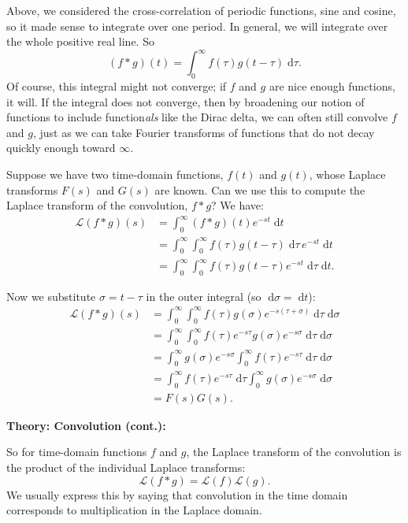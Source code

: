 \documentclass{article}
\newcommand{\diff}{\;\mathrm{d}}
\begin{document}
Above, we considered the cross-correlation of periodic functions, sine and cosine, so it made sense to integrate over one period. In general, we will integrate over the whole positive real line. So
\[(f\ast g)(t)=\int_{0}^\infty f(\tau)g(t-\tau)\diff \tau.\]
Of course, this integral might not converge; if $f$ and $g$ are nice enough functions, it will. If the integral does not converge, then by broadening our notion of functions to include function\textit{als} like the Dirac delta, we can often still convolve $f$ and $g$, just as we can take Fourier transforms of functions that do not decay quickly enough toward $\infty$.\bigskip



Suppose we have two time-domain functions, $f(t)$ and $g(t)$, whose Laplace transforms $F(s)$ and $G(s)$ are known. Can we use this to compute the Laplace transform of the convolution, $f\ast g$? We have:
\begin{align*}
	\mathcal{L}\left({f\ast g}\right)(s) &=\int_{0}^\infty (f\ast g)(t)e^{-st}\diff t\\
	&=\int_{0}^\infty\int_{0}^\infty f(\tau)g(t-\tau)\diff \tau\,e^{-s t}\diff t\\
	&=\int_0^\infty\int_0^\infty f(\tau)g(t-\tau)e^{-s t}\diff \tau\diff t.
\end{align*}

Now we substitute $\sigma=t-\tau$ in the outer integral (so $\diff \sigma =\diff t$):
\begin{align*}
	\mathcal{L}\left({f\ast g}\right)(s)&= \int_0^\infty\int_0^\infty f(\tau)g(\sigma)e^{-s (\tau+\sigma)}\diff \tau\diff\sigma\\
	&=\int_0^\infty \int_0^\infty f(\tau)e^{-s \tau}g(\sigma)e^{-s \sigma}\diff \tau\diff \sigma\\
	&=\int_0^\infty g(\sigma) e^{-s \sigma}\int_{0}^\infty f(\tau)e^{-s \tau}\diff \tau \diff\sigma\\
	&=\int_{0}^\infty f(\tau)e^{-s \tau}\diff \tau \int_{0}^\infty g(\sigma)e^{-s \sigma}\diff\sigma\\
	&=F(s)G(s).
\end{align*}


\clearpage


\textbf{Theory: Convolution (cont.):}\bigskip


So for time-domain functions $f$ and $g$, the Laplace transform of the convolution is the product of the individual Laplace transforms:
\[\mathcal{L}(f\ast g) = \mathcal{L}(f)\mathcal{L}(g).\]
We usually express this by saying that convolution in the time domain corresponds to multiplication in the Laplace domain.
\end{document}
